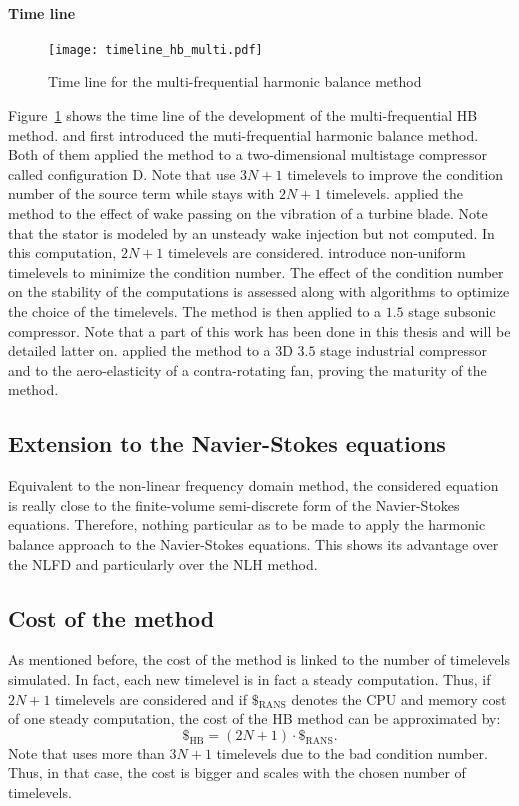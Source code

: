 \paragraph{Time line}
\begin{figure}[htbp]
  \centering
  \texttt{[image: timeline\_hb\_multi.pdf]}
  \caption{Time line for the multi-frequential harmonic balance method}
  \label{fig:timeline_hb_multi}
\end{figure}
Figure~\ref{fig:timeline_hb_multi} shows the time line of the
development of the multi-frequential HB method.
\citet{Gopinath2007} and \citet{Ekici2007}
first introduced the muti-frequential harmonic balance
method. Both of them applied the method to
a two-dimensional multistage compressor called
configuration D. Note that \citet{Ekici2007} use
$3N+1$ timelevels to improve the condition number
of the source term while \citet{Gopinath2007}
stays with $2N+1$ timelevels.
\citet{Ekici2008a} applied the method
to the effect of wake passing on the vibration of
a turbine blade. Note that the stator is modeled
by an unsteady wake injection but not computed.
In this computation, $2N+1$ timelevels are considered.
\citet{JGuedeney2013} introduce non-uniform 
timelevels to minimize the condition number. 
The effect of the condition number on the stability
of the computations is assessed along with algorithms
to optimize the choice of the timelevels.
The method is then applied
to a $1.5$ stage subsonic compressor.
Note that a part of this work has been done in this
thesis and will be detailed latter on.
\citet{JSicot2013} applied the method to a $3$D
$3.5$ stage industrial compressor and to the
aero-elasticity of a contra-rotating fan, proving
the maturity of the method.

\subsection{Extension to the Navier-Stokes equations}
Equivalent to the non-linear frequency domain method, the
considered equation is really close to the finite-volume
semi-discrete form of the Navier-Stokes equations. Therefore,
nothing particular as to be made to apply the harmonic balance approach
to the Navier-Stokes equations.
This shows its advantage over the NLFD and particularly over the NLH method.


\subsection{Cost of the method}
As mentioned before, the cost of the method is linked to
the number of timelevels simulated.
In fact, each new timelevel is in fact a steady computation.
Thus, if $2N+1$ timelevels are considered and if $\mathdollar_{\text{RANS}}$ 
denotes the CPU and memory cost of
one steady computation, the cost of the HB method can be 
approximated by:
\begin{equation}
	\mathdollar_{\text{HB}} = (2N+1) \cdot \mathdollar_{\text{RANS}}.
\end{equation}
Note that \citet{Ekici2007,Ekici2008a} uses more than $3N+1$
timelevels due to the bad condition number. Thus, in that
case, the cost is bigger and scales with the chosen number
of timelevels.